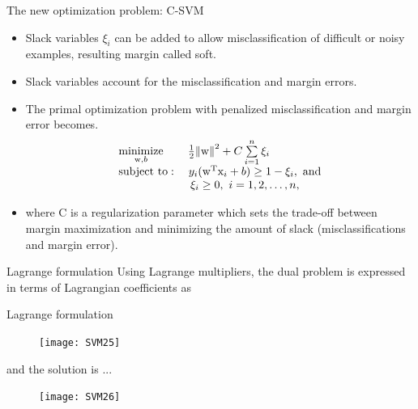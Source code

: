 \begin{frame}{The new optimization problem: C-SVM}
\begin{itemize}
\item Slack variables $\xi_i$ can be added to allow misclassification of difficult or noisy examples, resulting margin called soft.
\item Slack variables account for the misclassification and margin errors.
\item The primal optimization problem with
penalized misclassification and margin error becomes.
\begin{equation}
\begin{array}{l}
\mathop {\rm minimize}\limits_{{{\rm w}},b} ~~~~~~\frac{1}{2}{\left\| {{\rm w}} \right\|^2} + C\sum\limits_{i = 1}^{n} {{\xi_i}} \\
{\rm subject~to}:~~~{y_i}({\rm w^{T}}{\rm x}_i + b) \ge 1 - {\xi_i},~{\rm and} \\ ~~~~~~~~~~~~~~~~~~~{\xi_i} \ge 0,~i = 1,2,\ldots,{n},
\end{array}
\end{equation}
\item where C is a regularization parameter which sets the trade-off between margin maximization and minimizing the amount of slack (misclassifications and margin error). 
\end{itemize}
\end{frame}


\begin{frame}{Lagrange formulation}
Using Lagrange multipliers, the dual problem is expressed in terms of Lagrangian coefficients as
\end{frame}

\begin{frame}{Lagrange formulation}
\begin{figure}
\texttt{[image: SVM25]}
\end{figure}
\end{frame}

\begin{frame}{and the solution is ...}
\begin{figure}
\texttt{[image: SVM26]}
\end{figure}
\end{frame}


